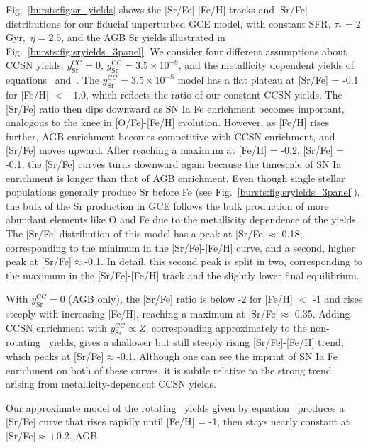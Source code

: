 Fig.~\ref{bursts:fig:sr_yields} shows the [Sr/Fe]-[Fe/H] tracks and [Sr/Fe] 
distributions for our fiducial unperturbed GCE model, with constant SFR, 
$\tau_* = 2$ Gyr,~$\eta = 2.5$, and the AGB Sr yields illustrated in 
Fig.~\ref{bursts:fig:sryields_3panel}. We consider four different assumptions about 
CCSN yields: $y_\text{Sr}^\text{CC} = 0$, $y_\text{Sr}^\text{CC} = 
3.5\times10^{-8}$, and the metallicity dependent yields of 
equations~ and~. The 
$y_\text{Sr}^\text{CC} = 3.5\times10^{-8}$ model has a flat plateau at 
[Sr/Fe] = -0.1 for [Fe/H] $< -1.0$, which reflects the ratio of our constant 
CCSN yields. The [Sr/Fe] ratio then dips downward as SN Ia Fe enrichment 
becomes important, analogous to the knee in [O/Fe]-[Fe/H] evolution. However, 
as [Fe/H] rises further, AGB enrichment becomes competitive with CCSN 
enrichment, and [Sr/Fe] moves upward. After reaching a maximum at [Fe/H] = 
-0.2, [Sr/Fe] = -0.1, the [Sr/Fe] curves turns downward again because the 
timescale of SN Ia enrichment is longer than that of AGB enrichment. Even 
though single stellar populations generally produce Sr before Fe (see 
Fig.~\ref{bursts:fig:sryields_3panel}), the bulk of the Sr production in GCE follows 
the bulk production of more abundant elements like O and Fe due to the 
metallicity dependence of the yields. The [Sr/Fe] distribution of this model 
has a peak at [Sr/Fe]$\approx$-0.18, corresponding to the minimum in the 
[Sr/Fe]-[Fe/H] curve, and a second, higher peak at [Sr/Fe]$\approx$-0.1. In 
detail, this second peak is split in two, corresponding to the maximum in the 
[Sr/Fe]-[Fe/H] track and the slightly lower final equilibrium. 
\par 
With $y_\text{Sr}^\text{CC} = 0$ (AGB only), the [Sr/Fe] ratio is below -2 for 
[Fe/H] $<$ -1 and rises steeply with increasing [Fe/H], reaching a maximum at 
[Sr/Fe]$\approx$-0.35. Adding CCSN enrichment with $y_\text{Sr}^\text{CC} 
\propto Z$, corresponding approximately to the non-rotating~\citet{Limongi2018} 
yields, gives a shallower but still steeply rising [Sr/Fe]-[Fe/H] trend, which 
peaks at [Sr/Fe]$\approx$-0.1. Although one can see the imprint of SN Ia Fe 
enrichment on both of these curves, it is subtle relative to the strong trend 
arising from metallicity-dependent CCSN yields. 
\par 
Our approximate model of the rotating~\citet{Limongi2018} yields given by 
equation~ produces a [Sr/Fe] curve that rises rapidly 
until [Fe/H] = -1, then stays nearly constant at [Sr/Fe]$\approx$+0.2. AGB 
